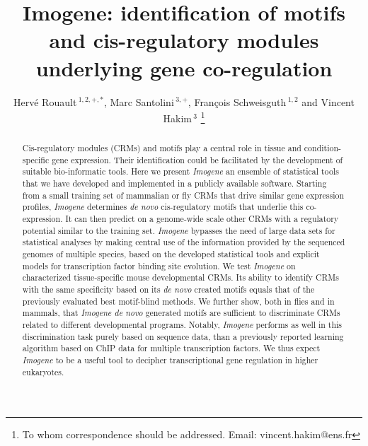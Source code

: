 \documentclass[a4,center,fleqn]{NAR}
\begin{document}
\title{Imogene: identification of motifs and cis-regulatory modules
underlying gene co-regulation}

\author{%
Herv\'e Rouault\,$^{1,2,+,*}$,
Marc Santolini\,$^{3,+}$,
Fran\c{c}ois Schweisguth\,$^{1,2}$ and
Vincent Hakim\,$^3$%
\footnote{To whom correspondence should be addressed.
 Email: vincent.hakim@ens.fr}}

\address{%
$^{1}$ Institut Pasteur, Developmental Biology Department,75015 Paris,
    France,
    $^{2}$CNRS, URA2578, F-75015 Paris, France,
$^{3}$Laboratoire de Physique Statistique, CNRS, \'Ecole Normale Sup\'erieure,
    Universit\'e P. et M. Curie, Universit\'e Paris-Diderot,\\
 $^+$ Have contributed equally\\
$^*$ present address: Janelia Farm Research Campus, Howard Hughes Medical
Institute, Ashburn, VA 20147, USA
}

\maketitle

\begin{abstract}
Cis-regulatory modules (CRMs) and motifs play a central role in tissue and
condition-specific gene expression.
Their identification could be facilitated by the development of suitable
bio-informatic tools.
Here we present {\em Imogene} an ensemble of statistical tools that we have
developed and implemented in a publicly available software.
Starting from a small training set of mammalian or fly CRMs that drive similar
gene expression profiles, {\em Imogene} determines {\em de novo} cis-regulatory
motifs that underlie this co-expression.
It can then predict on a genome-wide scale other CRMs with a regulatory
potential similar to the training set.
{\em Imogene} bypasses the need of large data sets for statistical analyses by
making central use of the information provided by the sequenced genomes of
multiple species, based on the developed statistical tools and explicit models
for transcription factor binding site evolution.
We test {\em Imogene} on characterized tissue-specific mouse developmental
CRMs.
Its ability to identify CRMs with the same specificity based on its {\em de
novo} created motifs equals that of the previously evaluated best motif-blind
methods.
We further show, both in flies and in mammals, that {\em Imogene de novo}
generated motifs are sufficient to discriminate CRMs related to different
developmental programs.
Notably, {\em Imogene} performs as well in this discrimination task purely
based on sequence data, than a previously reported learning algorithm based on
ChIP data for multiple transcription factors.
We thus expect {\em Imogene} to be a useful tool to decipher transcriptional
gene regulation in higher eukaryotes.
\end{abstract}
\end{document}
